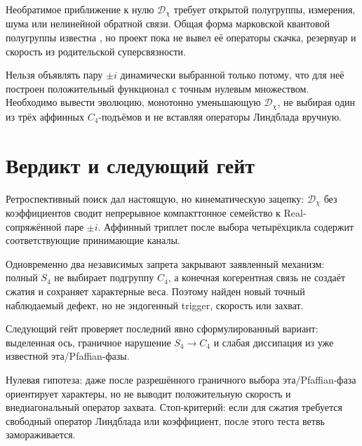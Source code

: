 Необратимое приближение к нулю $\mathcal D_\chi$ требует открытой
полугруппы, измерения, шума или нелинейной обратной связи. Общая форма
марковской квантовой полугруппы известна
\cite{compacton-c4-gks1976,compacton-c4-lindblad1976}, но проект пока не
вывел её операторы скачка, резервуар и скорость из родительской
суперсвязности.

\begin{nogocriterion}
Нельзя объявлять пару $\pm i$ динамически выбранной только потому, что
для неё построен положительный функционал с точным нулевым множеством.
Необходимо вывести эволюцию, монотонно уменьшающую
$\mathcal D_\chi$, не выбирая один из трёх аффинных $C_4$-подъёмов и не
вставляя операторы Линдблада вручную.
\end{nogocriterion}

\section{Вердикт и следующий гейт}

Ретроспективный поиск дал настоящую, но кинематическую зацепку:
$\mathcal D_\chi$ без коэффициентов сводит непрерывное компакттонное
семейство к Real-сопряжённой паре $\pm i$. Аффинный триплет после выбора
четырёхцикла содержит соответствующие принимающие каналы.

Одновременно два независимых запрета закрывают заявленный механизм:
полный $S_4$ не выбирает подгруппу $C_4$, а конечная когерентная связь не
создаёт сжатия и сохраняет характерные веса. Поэтому найден новый точный
наблюдаемый дефект, но не эндогенный trigger, скорость или захват.

Следующий гейт
проверяет последний явно сформулированный вариант: выделенная ось,
граничное нарушение $S_4\to C_4$ и слабая диссипация из уже известной
эта/Pfaffian-фазы.

Нулевая гипотеза: даже после разрешённого граничного выбора
эта/Pfaffian-фаза ориентирует характеры, но не выводит положительную
скорость и внедиагональный оператор захвата. Стоп-критерий: если для
сжатия требуется свободный оператор Линдблада или коэффициент, после
этого теста ветвь замораживается.

